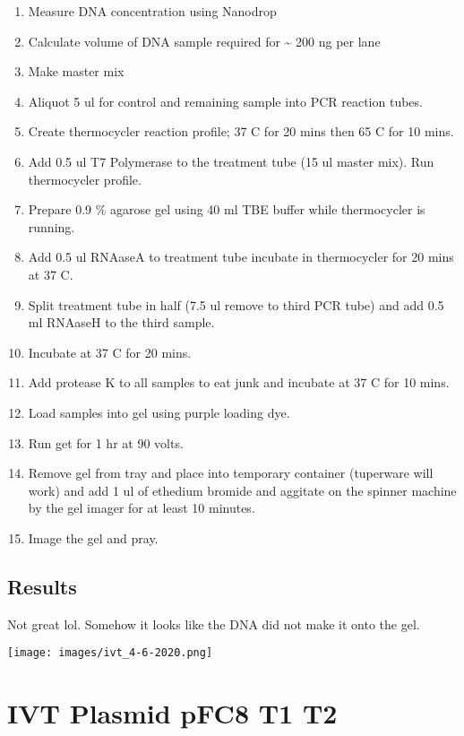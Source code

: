 \documentclass[
]{book}
\providecommand{\tightlist}{%
  \setlength{\itemsep}{0pt}\setlength{\parskip}{0pt}}
\begin{document}
\begin{enumerate}
\def\labelenumi{\arabic{enumi}.}
\tightlist
\item
  Measure DNA concentration using Nanodrop
\item
  Calculate volume of DNA sample required for \textasciitilde{} 200 ng
  per lane
\item
  Make master mix
\item
  Aliquot 5 ul for control and remaining sample into PCR reaction tubes.
\item
  Create thermocycler reaction profile; 37 C for 20 mins then 65 C for
  10 mins.
\item
  Add 0.5 ul T7 Polymerase to the treatment tube (15 ul master mix). Run
  thermocycler profile.
\item
  Prepare 0.9 \% agarose gel using 40 ml TBE buffer while thermocycler
  is running.
\item
  Add 0.5 ul RNAaseA to treatment tube incubate in thermocycler for 20
  mins at 37 C.
\item
  Split treatment tube in half (7.5 ul remove to third PCR tube) and add
  0.5 ml RNAaseH to the third sample.
\item
  Incubate at 37 C for 20 mins.
\item
  Add protease K to all samples to eat junk and incubate at 37 C for 10
  mins.
\item
  Load samples into gel using purple loading dye.
\item
  Run get for 1 hr at 90 volts.
\item
  Remove gel from tray and place into temporary container (tuperware
  will work) and add 1 ul of ethedium bromide and aggitate on the
  spinner machine by the gel imager for at least 10 minutes.
\item
  Image the gel and pray.
\end{enumerate}

\hypertarget{results}{%
\section{Results}\label{results}}

Not great lol. Somehow it looks like the DNA did not make it onto the
gel.

\texttt{[image: images/ivt\_4-6-2020.png]}

\hypertarget{ivt-plasmid-pfc8-t1-t2}{%
\chapter{IVT Plasmid pFC8 T1 T2}\label{ivt-plasmid-pfc8-t1-t2}}
\end{document}

